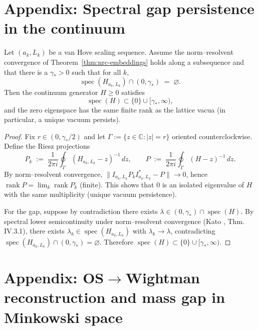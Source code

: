 \documentclass[11pt]{amsart}
\begin{document}
\medskip
\section{Appendix: Spectral gap persistence in the continuum}

\begin{theorem}\label{thm:gap-persist-cont}
Let $(a_k,L_k)$ be a van Hove scaling sequence. Assume the norm--resolvent convergence of Theorem~\ref{thm:nrc-embeddings} holds along a subsequence and that there is a $\gamma_*>0$ such that for all $k$,
\[
  \operatorname{spec}(H_{a_k,L_k})\cap(0,\gamma_*)\;=\;\varnothing.
\]
Then the continuum generator $H\ge 0$ satisfies
\[
  \operatorname{spec}(H)\subset \{0\}\cup[\gamma_*,\infty),
\]
and the zero eigenspace has the same finite rank as the lattice vacua (in particular, a unique vacuum persists).
\end{theorem}
\begin{proof}
Fix $r\in(0,\gamma_*/2)$ and let $\Gamma:=\{z\in\mathbb C:|z|=r\}$ oriented counterclockwise. Define the Riesz projections
\[
  P_k\;:=\;\frac{1}{2\pi i}\oint_\Gamma (H_{a_k,L_k}-z)^{-1}\,dz,\qquad
  P\;:=\;\frac{1}{2\pi i}\oint_\Gamma (H-z)^{-1}\,dz.
\]
By norm--resolvent convergence, $\|I_{a_k,L_k} P_k I_{a_k,L_k}^*-P\|\to 0$, hence $\operatorname{rank}P=\lim_k \operatorname{rank}P_k$ (finite). This shows that $0$ is an isolated eigenvalue of $H$ with the same multiplicity (unique vacuum persistence).

For the gap, suppose by contradiction there exists $\lambda\in (0,\gamma_*)\cap\operatorname{spec}(H)$. By spectral lower semicontinuity under norm--resolvent convergence (Kato \cite{Kato1995}, Thm. IV.3.1), there exists $\lambda_k\in \operatorname{spec}(H_{a_k,L_k})$ with $\lambda_k\to \lambda$, contradicting $\operatorname{spec}(H_{a_k,L_k})\cap(0,\gamma_*)=\varnothing$. Therefore $\operatorname{spec}(H)\subset \{0\}\cup[\gamma_*,\infty)$.
\end{proof}

\medskip
\section{Appendix: OS$\to$Wightman reconstruction and mass gap in Minkowski space}
\end{document}
